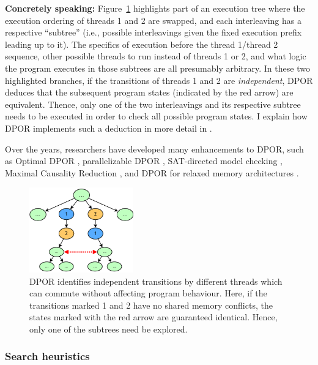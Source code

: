 {\bf Concretely speaking:}
Figure~\ref{fig:dpor} highlights part of an execution tree where the execution ordering of threads 1 and 2 are swapped,
and each interleaving has a respective ``subtree'' (i.e., possible interleavings given the fixed execution prefix leading up to it).
The specifics of execution before the thread 1/thread 2 sequence,
other possible threads to run instead of threads 1 or 2,
and what logic the program executes in those subtrees
are all presumably arbitrary.
In these two highlighted branches,
if the transitions of threads 1 and 2 are {\em independent},
DPOR deduces that the subsequent program states (indicated by the red arrow) are equivalent.
Thence, only one of the two interleavings and its respective subtree needs to be executed
in order to check all possible program states.
I explain how DPOR implements such a deduction in more detail in \sect{\ref{sec:landslide-dpor}}.

Over the years, researchers have developed many enhancements to DPOR, such as Optimal DPOR \cite{optimal-dpor}, parallelizable DPOR \cite{parallel-dpor}, SAT-directed model checking \cite{satcheck}, Maximal Causality Reduction \cite{mcr}, and DPOR for relaxed memory architectures \cite{tsopso}.

\begin{figure}[t]
	\begin{center}
	\includegraphics[width=0.4\textwidth]{dpor.pdf}
	\end{center}
	\caption{DPOR identifies independent transitions by different threads which can commute without affecting program behaviour. Here, if the transitions marked 1 and 2 have no shared memory conflicts, the states marked with the red arrow are guaranteed identical. Hence, only one of the subtrees need be explored.}
	\label{fig:dpor}
\end{figure}

\subsubsection{Search heuristics}

